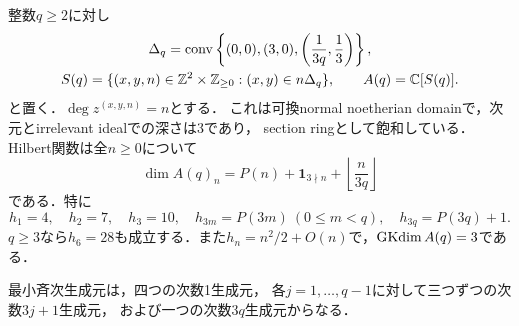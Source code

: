 \documentclass[11pt,a4paper]{ltjsarticle}
\begin{document}
\begin{proposition}[有限検査を通る半群環]\label{prop:finitefamily}
整数$q\geq2$に対し
\[
 \begin{gathered}
 \Delta_q=\operatorname{conv}
 \left\{(0,0),(3,0),\left(\frac1{3q},\frac13\right)\right\},\\
 S(q)=\{(x,y,n)\in\mathbb Z^2\times\mathbb Z_{\geq0}:(x,y)\in n\Delta_q\},\qquad A(q)=\mathbb C[S(q)].
 \end{gathered}
\]
と置く．$\deg z^{(x,y,n)}=n$とする．
これは可換normal noetherian domainで，次元とirrelevant idealでの深さは3であり，
section ringとして飽和している．Hilbert関数は全$n\geq0$について
\begin{equation}\label{eq:finitehilbert}
 \dim A(q)_n=P(n)+\mathbf1_{3\nmid n}
                      +\left\lfloor\frac{n}{3q}\right\rfloor
\end{equation}
である．特に
\[
 h_1=4,\quad h_2=7,\quad h_3=10,\quad
 h_{3m}=P(3m)\ (0\leq m<q),\quad h_{3q}=P(3q)+1.
\]
$q\geq3$なら$h_6=28$も成立する．また$h_n=n^2/2+O(n)$で，$\operatorname{GKdim} A(q)=3$である．

最小斉次生成元は，四つの次数1生成元，
各$j=1,\ldots,q-1$に対して三つずつの次数$3j+1$生成元，
および一つの次数$3q$生成元からなる．
\end{proposition}
\end{document}
